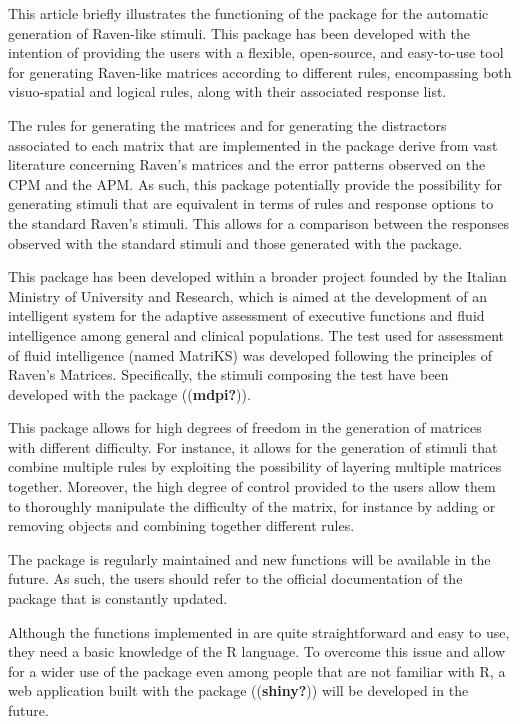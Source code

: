 This article briefly illustrates the functioning of the  package for the automatic generation of Raven-like stimuli.
This package has been developed with the intention of providing the users with a flexible, open-source, and easy-to-use tool for generating Raven-like matrices according to different rules, encompassing both visuo-spatial and logical rules, along with their associated response list.

The rules for generating the matrices and for generating the distractors associated to each matrix that are implemented in the  package derive from vast literature concerning Raven's matrices and the error patterns observed on the CPM and the APM.
As such, this package potentially provide the possibility for generating stimuli that are equivalent in terms of rules and response options to the standard Raven's stimuli. This allows for a comparison between the responses observed with the standard stimuli and those generated with the package.

This package has been developed within a broader project founded by the Italian Ministry of University and Research, which is aimed at the development of an intelligent system for the adaptive assessment of executive functions and fluid intelligence among general and clinical populations. The test used for assessment of fluid intelligence (named MatriKS) was developed following the principles of Raven's Matrices. Specifically, the stimuli composing the test have been developed with the  package ((\textbf{mdpi?})).

This package allows for high degrees of freedom in the generation of matrices with different difficulty. For instance, it allows for the generation of stimuli that combine multiple rules by exploiting the possibility of layering multiple matrices together. Moreover, the high degree of control provided to the users allow them to thoroughly manipulate the difficulty of the matrix, for instance by adding or removing objects and combining together different rules.

The package is regularly maintained and new functions will be available in the future. As such, the users should refer to the official documentation of the package that is constantly updated.

Although the functions implemented in  are quite straightforward and easy to use, they need a basic knowledge of the R language. To overcome this issue and allow for a wider use of the package even among people that are not familiar with R, a web application built with the  package ((\textbf{shiny?})) will be developed in the future.

